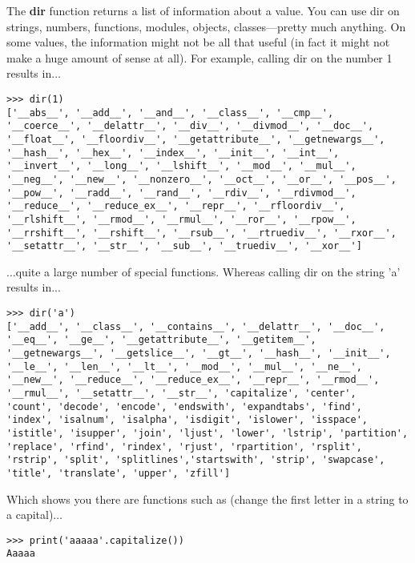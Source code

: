 The \textbf{dir} function returns a list of information about a value.  You can use dir on strings, numbers, functions, modules, objects, classes---pretty much anything.  On some values, the information might not be all that useful (in fact it might not make a huge amount of sense at all).  For example, calling dir on the number 1 results in$\ldots$

\begin{Verbatim}[frame=single]
>>> dir(1)
['__abs__', '__add__', '__and__', '__class__', '__cmp__',
'__coerce__', '__delattr__', '__div__', '__divmod__', '__doc__',
'__float__', '__floordiv__', '__getattribute__', '__getnewargs__',
'__hash__', '__hex__', '__index__', '__init__', '__int__',
'__invert__', '__long__', '__lshift__', '__mod__', '__mul__',
'__neg__', '__new__', '__nonzero__', '__oct__', '__or__', '__pos__', '__pow__', '__radd__', '__rand__', '__rdiv__', '__rdivmod__',
'__reduce__', '__reduce_ex__', '__repr__', '__rfloordiv__',
'__rlshift__', '__rmod__', '__rmul__', '__ror__', '__rpow__',
'__rrshift__', '__rshift__', '__rsub__', '__rtruediv__', '__rxor__',
'__setattr__', '__str__', '__sub__', '__truediv__', '__xor__']
\end{Verbatim}

$\ldots$quite a large number of special functions. Whereas calling dir on the string 'a' results in...

\begin{Verbatim}[frame=single]
>>> dir('a')
['__add__', '__class__', '__contains__', '__delattr__', '__doc__',
'__eq__', '__ge__', '__getattribute__', '__getitem__',
'__getnewargs__', '__getslice__', '__gt__', '__hash__', '__init__',
'__le__', '__len__', '__lt__', '__mod__', '__mul__', '__ne__',
'__new__', '__reduce__', '__reduce_ex__', '__repr__', '__rmod__',
'__rmul__', '__setattr__', '__str__', 'capitalize', 'center',
'count', 'decode', 'encode', 'endswith', 'expandtabs', 'find',
'index', 'isalnum', 'isalpha', 'isdigit', 'islower', 'isspace',
'istitle', 'isupper', 'join', 'ljust', 'lower', 'lstrip', 'partition',
'replace', 'rfind', 'rindex', 'rjust', 'rpartition', 'rsplit',
'rstrip', 'split', 'splitlines','startswith', 'strip', 'swapcase',
'title', 'translate', 'upper', 'zfill']
\end{Verbatim}

Which shows you there are functions such as  (change the first letter in a string to a capital)$\ldots$

\begin{Verbatim}[frame=single]
>>> print('aaaaa'.capitalize())
Aaaaa
\end{Verbatim}

